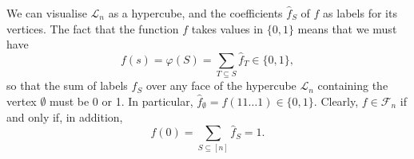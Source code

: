 \documentclass[12pt]{article}
\newtheorem{lemma}{Lemma}
\theoremstyle{definition}
\theoremstyle{remark}
\newtheorem{remark}{Remark}
\def\Fe{\mathcal F}
\def\<{\langle\,}
\def\>{\,\rangle}
\begin{document}
%
%
%
%
%
%
%
%
%

 We can  visualise $\mathcal L_n$ as a hypercube, and the coefficients $\hat f_S$ of  $f$ as labels for its vertices.
The fact that the function $f$ takes  values in $\{0,1\}$ means that we must have 
\[
f(s)=\varphi(S)=\sum_{T\subseteq S} \hat f_T\in \{0,1\},
\]
so that  the sum of labels $\hat f_S$ over any face of the hypercube $\mathcal L_n$ containing the vertex 
$\emptyset$ must
be 0 or 1. In particular, $\hat f_\emptyset=f(11\dots 1)\in \{0,1\}$. Clearly,  $f\in
\Fe_n$ if and only if,  in addition,
\[
f(0)=\sum_{S\subseteq [n]}\hat f_S=1.
\]
\end{document}

